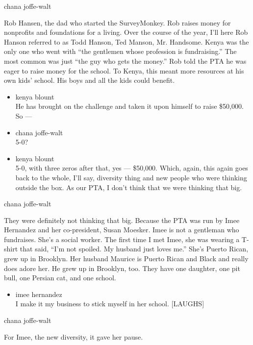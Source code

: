 chana joffe-walt

Rob Hansen, the dad who started the SurveyMonkey. Rob raises money for
nonprofits and foundations for a living. Over the course of the year,
I'll here Rob Hanson referred to as Todd Hanson, Ted Manson, Mr.
Handsome. Kenya was the only one who went with ``the gentlemen whose
profession is fundraising.'' The most common was just ``the guy who gets
the money.'' Rob told the PTA he was eager to raise money for the
school. To Kenya, this meant more resources at his own kids' school. His
boys and all the kids could benefit.

\begin{itemize}
\item
  kenya blount\\
  He has brought on the challenge and taken it upon himself to raise
  \$50,000. So ---
\item
  chana joffe-walt\\
  5-0?
\item
  kenya blount\\
  5-0, with three zeros after that, yes --- \$50,000. Which, again, this
  again goes back to the whole, I'll say, diversity thing and new people
  who were thinking outside the box. As our PTA, I don't think that we
  were thinking that big.
\end{itemize}

chana joffe-walt

They were definitely not thinking that big. Because the PTA was run by
Imee Hernandez and her co-president, Susan Moesker. Imee is not a
gentleman who fundraises. She's a social worker. The first time I met
Imee, she was wearing a T-shirt that said, ``I'm not spoiled. My husband
just loves me.'' She's Puerto Rican, grew up in Brooklyn. Her husband
Maurice is Puerto Rican and Black and really does adore her. He grew up
in Brooklyn, too. They have one daughter, one pit bull, one Persian cat,
and one school.

\begin{itemize}
\tightlist
\item
  imee hernandez\\
  I make it my business to stick myself in her school. {[}LAUGHS{]}
\end{itemize}

chana joffe-walt

For Imee, the new diversity, it gave her pause.

